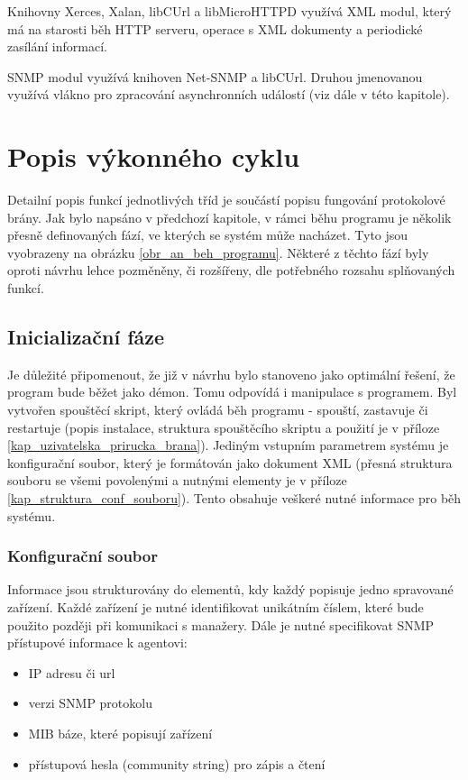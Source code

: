 Knihovny Xerces, Xalan, libCUrl a libMicroHTTPD využívá XML modul, který má na starosti běh HTTP serveru, operace s XML dokumenty a periodické zasílání
informací.

SNMP modul využívá knihoven Net-SNMP a libCUrl. Druhou jmenovanou využívá vlákno pro zpracování asynchronních událostí (viz dále v této kapitole).


\section{Popis výkonného cyklu}
Detailní popis funkcí jednotlivých tříd je součástí popisu fungování protokolové brány. Jak bylo napsáno v předchozí kapitole,
v rámci běhu programu je několik přesně definovaných fází, ve kterých se systém může nacházet. Tyto jsou vyobrazeny na obrázku \ref{obr_an_beh_programu}.
Některé z těchto fází byly oproti návrhu lehce pozměněny, či rozšířeny, dle potřebného rozsahu splňovaných funkcí.

\subsection{Inicializační fáze}
Je důležité připomenout, že již v návrhu bylo stanoveno jako optimální řešení, že program bude běžet jako démon. Tomu odpovídá
i manipulace s programem. Byl vytvořen spouštěcí skript, který ovládá běh programu - spouští, zastavuje či restartuje (popis instalace,
struktura spouštěcího skriptu a použití je v příloze \ref{kap_uzivatelska_prirucka_brana}).
Jediným vstupním parametrem systému je konfigurační soubor, který je formátován jako dokument XML (přesná struktura souboru se všemi 
povolenými a nutnými elementy je v příloze \ref{kap_struktura_conf_souboru}). Tento obsahuje veškeré nutné informace pro běh systému.

\subsubsection*{Konfigurační soubor}
Informace jsou strukturovány do elementů, kdy každý popisuje jedno spravované zařízení. Každé zařízení je nutné identifikovat
unikátním číslem, které bude použito později při komunikaci s manažery. Dále je nutné specifikovat SNMP přístupové informace
k agentovi:
\begin{itemize}
	\item IP adresu či url
	\item verzi SNMP protokolu
	\item MIB báze, které popisují zařízení
	\item přístupová hesla (community string) pro zápis a čtení
\end{itemize}

